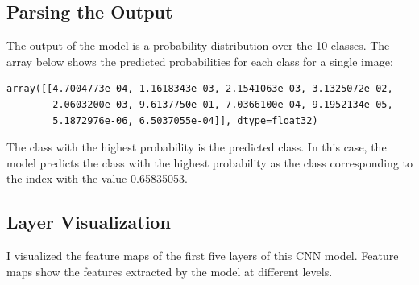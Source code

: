 \documentclass[12pt]{article}
\begin{document}
\subsection{Parsing the Output}
The output of the model is a probability distribution over the 10 classes. 
The array below shows the predicted probabilities for each class for a single image:

\begin{verbatim}
array([[4.7004773e-04, 1.1618343e-03, 2.1541063e-03, 3.1325072e-02,
        2.0603200e-03, 9.6137750e-01, 7.0366100e-04, 9.1952134e-05,
        5.1872976e-06, 6.5037055e-04]], dtype=float32)
\end{verbatim}

The class with the highest probability is the predicted class. 
In this case, the model predicts the class with the highest probability as the class corresponding to the index with the value 0.65835053.
\subsection{Layer Visualization}
I visualized the feature maps of the first five layers of this CNN model. 
Feature maps show the features extracted by the model at different levels.
\end{document}
